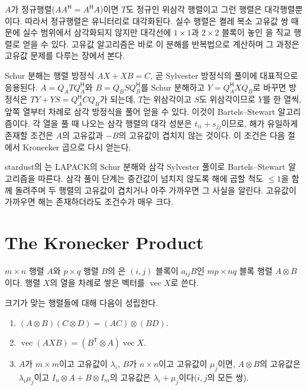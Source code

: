 $A$가 정규행렬($AA^{\mathsf H}=A^{\mathsf H}A$)이면 $T$도 정규인 위삼각 행렬이고 그런 행렬은 대각행렬뿐이다. 따라서 정규행렬은 유니터리로 대각화된다. 실수 행렬은 켤레 복소 고유값 쌍 때문에 실수 범위에서 삼각화되지 않지만 대각선에 $1\times1$과 $2\times2$ 블록이 놓인 을 직교 행렬로 얻을 수 있다. 고유값 알고리즘은 바로 이 분해를 반복법으로 계산하며 그 과정은 고유값 문제를 다루는 장에서 본다.

Schur 분해는 행렬 방정식 $AX+XB=C$, 곧 Sylvester 방정식의 풀이에 대표적으로 응용된다. $A=Q_ATQ_A^{\mathsf H}$와 $B=Q_BSQ_B^{\mathsf H}$를 Schur 분해하고 $Y=Q_A^{\mathsf H}XQ_B$로 바꾸면 방정식은 $TY+YS=Q_A^{\mathsf H}CQ_B$가 되는데, $T$는 위삼각이고 $S$도 위삼각이므로 $Y$를 한 열씩, 앞쪽 열부터 차례로 삼각 방정식을 풀어 얻을 수 있다. 이것이 Bartels--Stewart 알고리즘이다\cite{bartels1972stewart}. 각 열을 풀 때 나오는 삼각 행렬의 대각 성분은 $t_{ii}+s_{jj}$이므로, 해가 유일하게 존재할 조건은 $A$의 고유값과 $-B$의 고유값이 겹치지 않는 것이다. 이 조건은 다음 절에서 Kronecker 곱으로 다시 얻는다.

\begin{instardust}
stardust의 는 LAPACK의 Schur 분해와 삼각 Sylvester 풀이로 Bartels--Stewart 알고리즘을 따른다. 삼각 풀이 단계는 중간값이 넘치지 않도록 해에 곱할 척도 $\le1$을 함께 돌려주며 두 행렬의 고유값이 겹치거나 아주 가까우면 그 사실을 알린다. 고유값이 가까우면 해는 존재하더라도 조건수가 매우 크다.
\end{instardust}

\section{The Kronecker Product}
\label{sec:kronecker}

\begin{definition}[Kronecker 곱]
\label{def:kron}
$m\times n$ 행렬 $A$와 $p\times q$ 행렬 $B$의 은 $(i,j)$ 블록이 $a_{ij}B$인 $mp\times nq$ 블록 행렬 $A\otimes B$이다. 행렬 $X$의 열을 차례로 쌓은 벡터를 $\operatorname{vec}X$로 쓴다.
\end{definition}

\begin{proposition}
\label{prop:kron}
크기가 맞는 행렬들에 대해 다음이 성립한다.
\begin{enumerate}
\item $(A\otimes B)(C\otimes D)=(AC)\otimes(BD)$.
\item $\operatorname{vec}(AXB)=(B^{\mathsf T}\otimes A)\operatorname{vec}X$.
\item $A$가 $m\times m$이고 고유값이 $\lambda_i$, $B$가 $n\times n$이고 고유값이 $\mu_j$이면, $A\otimes B$의 고유값은 $\lambda_i\mu_j$이고 $I_n\otimes A+B\otimes I_m$의 고유값은 $\lambda_i+\mu_j$이다($i,j$의 모든 쌍).
\end{enumerate}
\end{proposition}

